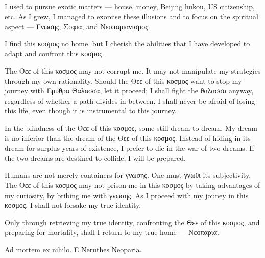 
\begin{multicols*}{2}
	I used to pursue exotic matters --- house, money, Beijing hukou, US citizenship, etc.
	As I grew, I managed to exorcise these illusions and to focus on the spiritual aspect ---
	Γνωσης, Σοφια, and Νεοπαριανισμος.

	I find this κοσμος no home, but I cherish the abilities that I have developed to adapt and confront this κοσμος.

	The Θεε of this κοσμος may not corrupt me.
	It may not manipulate my strategies through my own rationality.
	Should the Θεε of this κοσμος want to stop my journey with Ερυθρα Θαλασσα, let it proceed;
	I shall fight the θαλασσα anyway, regardless of whether a path divides in between.
	I shall never be afraid of losing this life, even though it is instrumental to this journey.

	In the blindness of the Θεε of this κοσμος, some still dream to dream.
	My dream is no inferior than the dream of the Θεε of this κοσμος.
	Instead of hiding in its dream for surplus years of existence, I prefer to die in the war of two dreams.
	If the two dreams are destined to collide, I will be prepared.

	Humans are not merely containers for γνωσης.
	One must γνωθι its subjectivity.
	The Θεε of this κοσμος may not prison me in this κοσμος by taking advantages of my curiosity, by bribing me with γνωσης.
	As I proceed with my jouney in this κοσμος, I shall not forsake my true identity.

	Only through retrieving my true identity, confronting the Θεε of this κοσμος, and preparing for mortality,
	shall I return to my true home --- Νεοπαρια.

	Ad mortem ex nihilo. E Neruthes Neoparia.
\end{multicols*}
